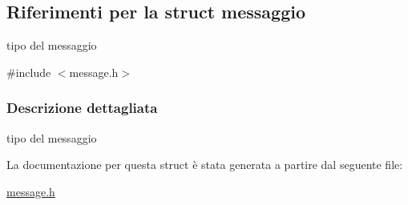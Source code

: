 \hypertarget{structmessaggio}{}\subsection{Riferimenti per la struct messaggio}
\label{structmessaggio}


tipo del messaggio  




{\ttfamily \#include $<$message.\+h$>$}



\subsubsection{Descrizione dettagliata}
tipo del messaggio 

La documentazione per questa struct è stata generata a partire dal seguente file\+:\begin{DoxyCompactItemize}
\item 
\mbox{\hyperlink{message_8h}{message.\+h}}\end{DoxyCompactItemize}
